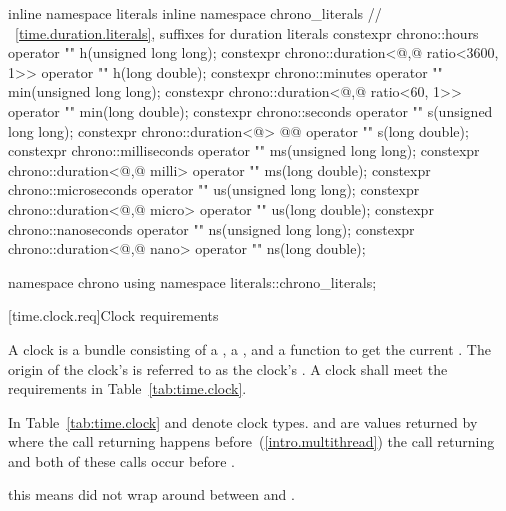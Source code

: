 \begin{codeblock}
{  inline namespace literals {
    inline namespace chrono_literals {
      // ~\ref{time.duration.literals}, suffixes for duration literals
      constexpr chrono::hours                                 operator "" h(unsigned long long);
      constexpr chrono::duration<@\unspec,@ ratio<3600, 1>> operator "" h(long double);
      constexpr chrono::minutes                               operator "" min(unsigned long long);
      constexpr chrono::duration<@\unspec,@ ratio<60, 1>>   operator "" min(long double);
      constexpr chrono::seconds                               operator "" s(unsigned long long);
      constexpr chrono::duration<@\unspec@> @\itcorr[-1]@                operator "" s(long double);
      constexpr chrono::milliseconds                          operator "" ms(unsigned long long);
      constexpr chrono::duration<@\unspec,@ milli>          operator "" ms(long double);
      constexpr chrono::microseconds                          operator "" us(unsigned long long);
      constexpr chrono::duration<@\unspec,@ micro>          operator "" us(long double);
      constexpr chrono::nanoseconds                           operator "" ns(unsigned long long);
      constexpr chrono::duration<@\unspec,@ nano>           operator "" ns(long double);
    }
  }

  namespace chrono {
    using namespace literals::chrono_literals;
  }
}
\end{codeblock}

[time.clock.req]{Clock requirements}

\pnum
A clock is a bundle consisting of a , a
, and a function  to get the current .
The origin of the clock's  is referred to as the clock's .
 A clock shall meet the requirements in Table~\ref{tab:time.clock}.

\pnum
In Table~\ref{tab:time.clock}  and  denote clock types.  and
 are values returned by  where the call returning  happens
before~(\ref{intro.multithread}) the call returning  and both of these calls
occur
before .
\begin{note} this means  did not wrap around between  and
. \end{note}

